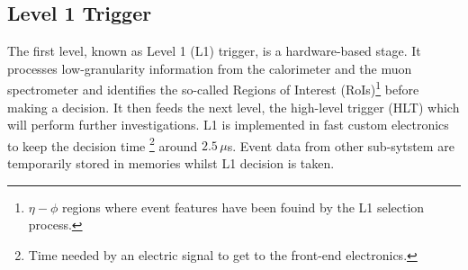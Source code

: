 

		\subsection{Level 1 Trigger}
		\label{sec:L1}

			The first level, known as Level 1 (L1) trigger, is a hardware-based stage. It processes low-granularity information from the calorimeter and the muon spectrometer and identifies the so-called Regions of Interest (RoIs)\footnote{$\eta - \phi$ regions where event features have been fouind by the L1 selection process.} before making a decision. It then feeds the next level, the high-level trigger (HLT) which will perform further investigations. L1 is implemented in fast custom electronics to keep the decision time \footnote{Time needed by an electric signal to get to the front-end electronics.} around $2.5\, \mu$s. Event data from other sub-sytstem are temporarily stored in memories whilst L1 decision is taken. 

